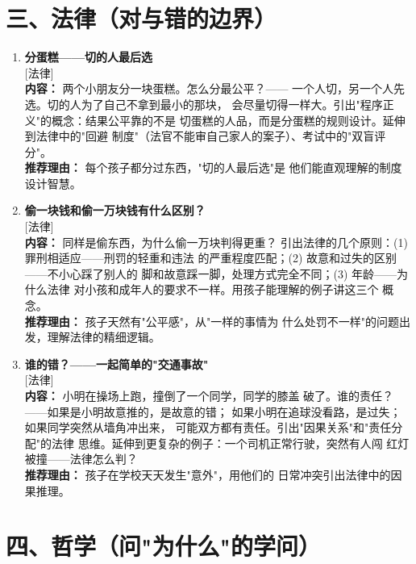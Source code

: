 \documentclass[a4paper,12pt]{ctexart}
\newcommand{\taglaw}{\textcolor{law}{\small [法律]}}
\begin{document}
\section*{\textcolor{orange!80!black}{三、法律（对与错的边界）}}

\begin{enumerate}

\item[\textbf{第9课}] \textbf{分蛋糕——切的人最后选} \\
\taglaw \\
\textbf{内容：} 两个小朋友分一块蛋糕。怎么分最公平？——
一个人切，另一个人先选。切的人为了自己不拿到最小的那块，
会尽量切得一样大。引出"程序正义"的概念：结果公平靠的不是
切蛋糕的人品，而是分蛋糕的规则设计。延伸到法律中的"回避
制度"（法官不能审自己家人的案子）、考试中的"双盲评分"。\\
\textbf{推荐理由：} 每个孩子都分过东西，"切的人最后选"是
他们能直观理解的制度设计智慧。

\item[\textbf{第10课}] \textbf{偷一块钱和偷一万块钱有什么区别？} \\
\taglaw \\
\textbf{内容：} 同样是偷东西，为什么偷一万块判得更重？
引出法律的几个原则：(1) 罪刑相适应——刑罚的轻重和违法
的严重程度匹配；(2) 故意和过失的区别——不小心踩了别人的
脚和故意踩一脚，处理方式完全不同；(3) 年龄——为什么法律
对小孩和成年人的要求不一样。用孩子能理解的例子讲这三个
概念。\\
\textbf{推荐理由：} 孩子天然有"公平感"，从"一样的事情为
什么处罚不一样"的问题出发，理解法律的精细逻辑。

\item[\textbf{第11课}] \textbf{谁的错？——一起简单的"交通事故"} \\
\taglaw \\
\textbf{内容：} 小明在操场上跑，撞倒了一个同学，同学的膝盖
破了。谁的责任？——如果是小明故意推的，是故意的错；
如果小明在追球没看路，是过失；如果同学突然从墙角冲出来，
可能双方都有责任。引出"因果关系"和"责任分配"的法律
思维。延伸到更复杂的例子：一个司机正常行驶，突然有人闯
红灯被撞——法律怎么判？\\
\textbf{推荐理由：} 孩子在学校天天发生"意外"，用他们的
日常冲突引出法律中的因果推理。

\end{enumerate}

\section*{\textcolor{orange!80!black}{四、哲学（问"为什么"的学问）}}
\end{document}

